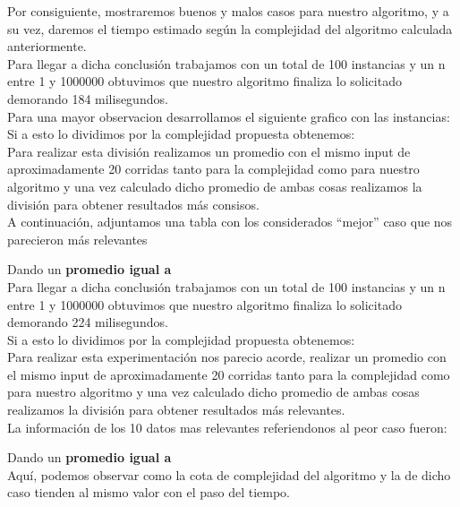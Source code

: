 \indent Por consiguiente, mostraremos buenos y malos casos para nuestro algoritmo, y a su vez, daremos el tiempo estimado 
seg\'un la complejidad del algoritmo calculada anteriormente.\\

Para llegar a dicha conclusi\'on trabajamos con un total de 100 instancias y un n entre 1 y 1000000 obtuvimos que nuestro
algoritmo finaliza lo solicitado demorando 184 milisegundos.\\

Para una mayor observacion desarrollamos el siguiente grafico con las instancias:\\


Si a esto lo dividimos por la complejidad propuesta obtenemos:\\

 Para realizar esta divisi\'on realizamos un promedio con el mismo input de aproximadamente 20 corridas
tanto para la complejidad como para nuestro algoritmo y una vez calculado dicho promedio de ambas cosas realizamos la divisi\'on para
obtener resultados m\'as consisos.\\ 

  
  
A continuaci\'on, adjuntamos una tabla con los considerados “mejor” caso que nos parecieron m\'as relevantes

Dando un \textbf{promedio igual a }\\

Para llegar a dicha conclusi\'on trabajamos con un total de 100 instancias y un n entre 1 y 1000000 obtuvimos que nuestro
algoritmo finaliza lo solicitado demorando 224 milisegundos.\\


Si a esto lo dividimos por la complejidad propuesta obtenemos:\\

  Para realizar esta experimentaci\'on nos parecio acorde, realizar un promedio con el mismo input de aproximadamente 20 corridas
tanto para la complejidad como para nuestro algoritmo y una vez calculado dicho promedio de ambas cosas realizamos la divisi\'on para
obtener resultados m\'as relevantes.\\ 


La informaci\'on de los 10 datos mas relevantes referiendonos al peor caso fueron:

Dando un \textbf{promedio igual a } \\

Aqu\'i, podemos observar como la cota de complejidad del algoritmo y la de dicho caso tienden al mismo valor con el paso del tiempo.\\